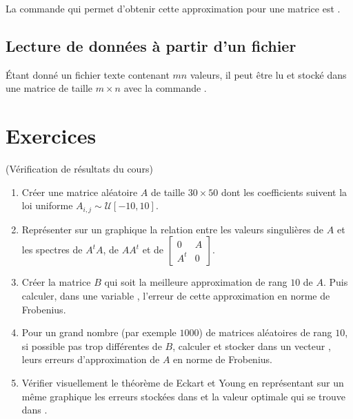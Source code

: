 \documentclass[a4paper,12pt,reqno]{amsart}
\begin{document}
La commande  qui permet d'obtenir cette approximation pour une matrice  est .

\subsection*{Lecture de données à partir d'un fichier}

Étant donné un fichier texte  contenant $mn$ valeurs, il peut être lu et stocké dans une matrice  de taille $m \times n$ avec la commande .


\section{Exercices}

\begin{exo} (Vérification de résultats du cours)

  \begin{enumerate}
    \item Créer une matrice aléatoire $A$ de taille $30 \times 50$ dont les coefficients suivent la loi uniforme $A_{i,j} \sim \mathcal{U}[-10,10]$.

    \item Représenter sur un graphique la relation entre les valeurs singulières de $A$ et les spectres de $A^{t}A$, de $AA^{t}$ et de
    $
      \left[
        \begin{smallmatrix}
              0 & A \\
          A^{t} & 0
        \end{smallmatrix}
      \right]
    $.

    \item Créer la matrice $B$ qui soit la meilleure approximation de rang $10$ de $A$. Puis calculer, dans une variable , l'erreur de cette approximation en norme de Frobenius.

    \item Pour un grand nombre (par exemple $1000$) de matrices aléatoires de rang $10$, si possible pas trop différentes de $B$, calculer et stocker dans un vecteur , leurs erreurs d'approximation de $A$ en norme de Frobenius.

     \item Vérifier visuellement le théorème de Eckart et Young en représentant sur un même graphique les erreurs stockées dans  et la valeur optimale qui se trouve dans .

  \end{enumerate}

\end{exo}
\end{document}
